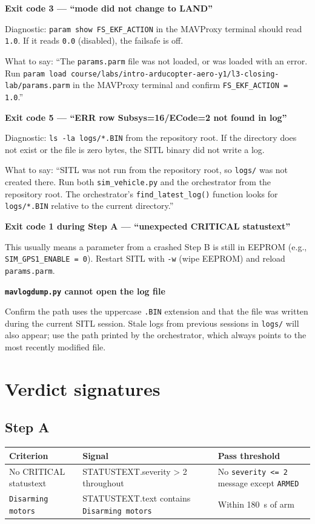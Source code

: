 \documentclass[a4paper,11pt,twoside]{article}
\begin{document}
\textbf{Exit code 3 --- ``mode did not change to LAND''}

Diagnostic: \texttt{param show FS\_EKF\_ACTION} in the MAVProxy terminal should read \texttt{1.0}. If it reads \texttt{0.0} (disabled), the failsafe is off.

What to say: ``The \texttt{params.parm} file was not loaded, or was loaded with an error. Run \texttt{param load course/labs/intro-arducopter-aero-y1/l3-closing-lab/params.parm} in the MAVProxy terminal and confirm \texttt{FS\_EKF\_ACTION = 1.0}.''

\textbf{Exit code 5 --- ``ERR row Subsys=16/ECode=2 not found in log''}

Diagnostic: \texttt{ls -la logs/*.BIN} from the repository root. If the directory does not exist or the file is zero bytes, the SITL binary did not write a log.

What to say: ``SITL was not run from the repository root, so \texttt{logs/} was not created there. Run both \texttt{sim\_vehicle.py} and the orchestrator from the repository root. The orchestrator's \texttt{find\_latest\_log()} function looks for \texttt{logs/*.BIN} relative to the current directory.''

\textbf{Exit code 1 during Step A --- ``unexpected CRITICAL statustext''}

This usually means a parameter from a crashed Step B is still in EEPROM (e.g., \texttt{SIM\_GPS1\_ENABLE = 0}). Restart SITL with \texttt{-w} (wipe EEPROM) and reload \texttt{params.parm}.

\textbf{\texttt{mavlogdump.py} cannot open the log file}

Confirm the path uses the uppercase \texttt{.BIN} extension and that the file was written during the current SITL session. Stale logs from previous sessions in \texttt{logs/} will also appear; use the path printed by the orchestrator, which always points to the most recently modified file.

\section*{Verdict signatures}

\subsection*{Step A}

\begin{center}\small
\begin{tabular}{|p{4.0cm}|p{5.5cm}|p{5.0cm}|}\hline
\textbf{Criterion} & \textbf{Signal} & \textbf{Pass threshold} \\ \hline
No CRITICAL statustext & STATUSTEXT.severity > 2 throughout & No \texttt{severity <= 2} message except \texttt{ARMED} \\ \hline
\texttt{Disarming motors} & STATUSTEXT.text contains \texttt{Disarming motors} & Within 180~s of arm \\ \hline
\end{tabular}
\end{center}
\end{document}
